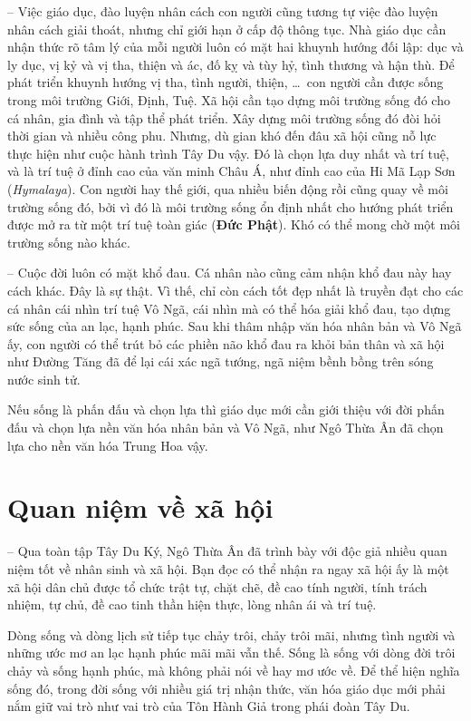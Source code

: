 -- Việc giáo dục, đào luyện nhân cách con người cũng tương tự việc đào luyện nhân cách giải thoát, nhưng chỉ giới hạn ở cấp độ thông tục. Nhà giáo dục cần nhận thức rõ tâm lý của mỗi người luôn có mặt hai khuynh hướng đối lập: dục và ly dục, vị kỷ và vị tha, thiện và ác, đố kỵ và tùy hỷ, tình thương và hận thù. Để phát triển khuynh hướng vị tha, tình người, thiện, \ldots ~con người cần được sống trong môi trường Giới, Định, Tuệ. Xã hội cần tạo dựng môi trường sống đó cho cá nhân, gia đình và tập thể phát triển. Xây dựng môi trường sống đó đòi hỏi thời gian và nhiều công phu. Nhưng, dù gian khó đến đâu xã hội cũng nỗ lực thực hiện như cuộc hành trình Tây Du vậy. Đó là chọn lựa duy nhất và trí tuệ, và là trí tuệ ở đỉnh cao của văn minh Châu Á, như đỉnh cao của Hi Mã Lạp Sơn (\emph{Hymalaya}). Con người hay thế giới, qua nhiều biến động rồi cũng quay về môi trường sống đó, bởi vì đó là môi trường sống ổn định nhất cho hướng phát triển được mở ra từ một trí tuệ toàn giác ({\bf Đức Phật}). Khó có thể mong chờ một môi trường sống nào khác.

-- Cuộc đời luôn có mặt khổ đau. Cá nhân nào cũng cảm nhận khổ đau này hay cách khác. Đây là sự thật. Vì thế, chỉ còn cách tốt đẹp nhất là truyền đạt cho các cá nhân cái nhìn trí tuệ Vô Ngã, cái nhìn mà có thể hóa giải khổ đau, tạo dựng sức sống của an lạc, hạnh phúc. Sau khi thâm nhập văn hóa nhân bản và Vô Ngã ấy, con người có thể trút bỏ các phiền não khổ đau ra khỏi bản thân và xã hội như Đường Tăng đã để lại cái xác ngã tướng, ngã niệm bềnh bồng trên sóng nước sinh tử.

Nếu sống là phấn đấu và chọn lựa thì giáo dục mới cần giới thiệu với đời phấn đấu và chọn lựa nền văn hóa nhân bản và Vô Ngã, như Ngô Thừa Ân đã chọn lựa cho nền văn hóa Trung Hoa vậy.

\section{Quan niệm về xã hội} %
\label{sec:98_99_100_xa_hoi}

-- Qua toàn tập Tây Du Ký, Ngô Thừa Ân đã trình bày với độc giả nhiều quan niệm tốt về nhân sinh và xã hội. Bạn đọc có thể nhận ra ngay xã hội ấy là một xã hội dân chủ được tổ chức trật tự, chặt chẽ, đề cao tính người, tính trách nhiệm, tự chủ, đề cao tinh thần hiện thực, lòng nhân ái và trí tuệ.

\hrulefill

Dòng sống và dòng lịch sử tiếp tục chảy trôi, chảy trôi mãi, nhưng tình người và những ước mơ an lạc hạnh phúc mãi mãi vẫn thế. Sống là sống với dòng đời trôi chảy và sống hạnh phúc, mà không phải nói về hay mơ ước về. Để thể hiện nghĩa sống đó, trong đời sống với nhiều giá trị nhận thức, văn hóa giáo dục mới phải nắm giữ vai trò như vai trò của Tôn Hành Giả trong phái đoàn Tây Du.
